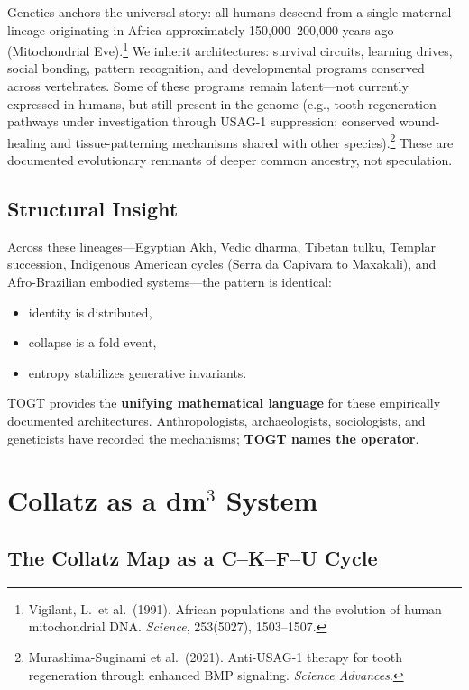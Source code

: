 \documentclass[14pt, twoside, openright]{book}
\theoremstyle{definition}
\theoremstyle{remark}
\begin{document}
Genetics anchors the universal story: all humans descend from a single maternal
lineage originating in Africa approximately 150,000--200,000 years ago
(Mitochondrial Eve).\footnote{Vigilant, L.\ et al.\ (1991). African populations
and the evolution of human mitochondrial DNA. \textit{Science}, 253(5027),
1503--1507.} We inherit architectures: survival circuits, learning drives, social
bonding, pattern recognition, and developmental programs conserved across
vertebrates. Some of these programs remain latent---not currently expressed in
humans, but still present in the genome (e.g., tooth-regeneration pathways under
investigation through USAG-1 suppression; conserved wound-healing and
tissue-patterning mechanisms shared with other species).\footnote{Murashima-Suginami
et al.\ (2021). Anti-USAG-1 therapy for tooth regeneration through enhanced BMP
signaling. \textit{Science Advances}.} These are documented evolutionary remnants
of deeper common ancestry, not speculation.

\section{Structural Insight}

Across these lineages---Egyptian Akh, Vedic dharma, Tibetan tulku, Templar
succession, Indigenous American cycles (Serra da Capivara to Maxakali), and
Afro-Brazilian embodied systems---the pattern is identical:

\begin{itemize}[leftmargin=2em]
  \item identity is distributed,
  \item collapse is a fold event,
  \item entropy stabilizes generative invariants.
\end{itemize}

TOGT provides the \textbf{unifying mathematical language} for these empirically
documented architectures. Anthropologists, archaeologists, sociologists, and
geneticists have recorded the mechanisms; \textbf{TOGT names the operator}.

\chapter{Collatz as a \texorpdfstring{dm$^{3}$}{dm3} System}

\section{The Collatz Map as a C--K--F--U Cycle}
\end{document}
